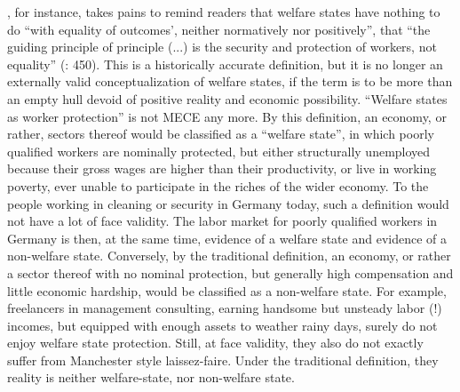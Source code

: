 \documentclass[11pt,a4paper,oneside,openright]{article}
\begin{document}
\begin{enumerate}
	\citeauthor{Offe2003}, for instance, takes pains to remind readers that welfare states have nothing to do ``with equality of outcomes', neither normatively nor positively'', that ``the guiding principle of principle (...) is the security and protection of workers, not equality'' (\citeyear{Offe2003}: 450). This is a historically accurate definition, but it is no longer an externally valid conceptualization of welfare states, if the term is to be more than an empty hull devoid of positive reality and economic possibility. ``Welfare states as worker protection'' is not \gls{MECE} any more. By this definition, an economy, or rather, sectors thereof would be classified as a ``welfare state'', in which poorly qualified workers are nominally protected, but either structurally unemployed because their gross wages are higher than their productivity, or live in working poverty, ever unable to participate in the riches of the wider economy. To the people working in cleaning or security in Germany today, such a definition would not have a lot of face validity. The labor market for poorly qualified workers in Germany is then, at the same time, evidence of a welfare state and evidence of a non-welfare state. Conversely, by the traditional definition, an economy, or rather a sector thereof with no nominal protection, but generally high compensation and little economic hardship, would be classified as a non-welfare state. For example, freelancers in management consulting, earning handsome but unsteady labor (!) incomes, but equipped with enough assets to weather rainy days, surely do not enjoy welfare state protection. Still, at face validity, they also do not exactly suffer from Manchester style laissez-faire. Under the traditional definition, they reality is neither welfare-state, nor non-welfare state.
	

\end{enumerate}
\end{document}
